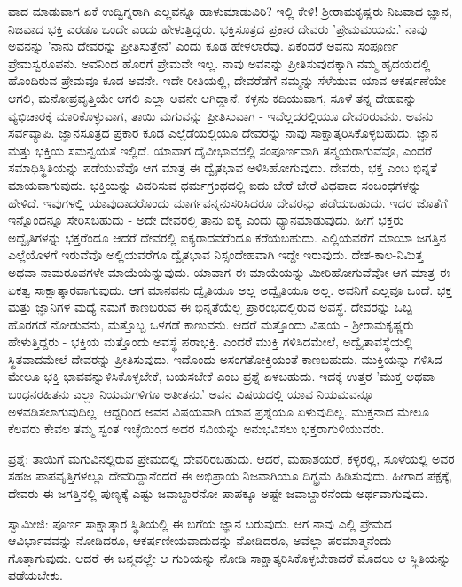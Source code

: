 ವಾದ ಮಾಡುವಾಗ ಏಕೆ ಉದ್ವಿಗ್ನರಾಗಿ ಎಲ್ಲವನ್ನೂ ಹಾಳುಮಾಡುವಿರಿ? ಇಲ್ಲಿ ಕೇಳಿ! ಶ‍್ರೀರಾಮಕೃಷ್ಣರು ನಿಜವಾದ ಜ್ಞಾನ, ನಿಜವಾದ ಭಕ್ತಿ ಎರಡೂ ಒಂದೇ ಎಂದು ಹೇಳುತ್ತಿದ್ದರು. ಭಕ್ತಿಸೂತ್ರದ ಪ್ರಕಾರ ದೇವರು 'ಪ್ರೇಮಮಯನು.' ನಾವು ಅವನನ್ನು 'ನಾನು ದೇವರನ್ನು ಪ್ರೀತಿಸುತ್ತೇನೆ' ಎಂದು ಕೂಡ ಹೇಳಲಾರೆವು. ಏಕೆಂದರೆ ಅವನು ಸಂಪೂರ್ಣ ಪ್ರೇಮಸ್ವರೂಪನು. ಅವನಿಂದ ಹೊರಗೆ ಪ್ರೇಮವೇ ಇಲ್ಲ. ನಾವು ಅವನನ್ನು ಪ್ರೀತಿಸುವುದಕ್ಕಾಗಿ ನಮ್ಮ ಹೃದಯದಲ್ಲಿ ಹೊಂದಿರುವ ಪ್ರೇಮವೂ ಕೂಡ ಅವನೇ. ಇದೇ ರೀತಿಯಲ್ಲಿ, ದೇವರೆಡೆಗೆ ನಮ್ಮನ್ನು ಸೆಳೆಯುವ ಯಾವ ಆಕರ್ಷಣೆಯೇ ಆಗಲಿ, ಮನೋಪ್ರವೃತ್ತಿಯೇ ಆಗಲಿ ಎಲ್ಲಾ ಅವನೇ ಆಗಿದ್ದಾನೆ. ಕಳ್ಳನು ಕದಿಯುವಾಗ, ಸೂಳೆ ತನ್ನ ದೇಹವನ್ನು ವ್ಯಭಿಚಾರಕ್ಕೆ ಮಾರಿಕೊಳ್ಳುವಾಗ, ತಾಯಿ ಮಗುವನ್ನು ಪ್ರೀತಿಸುವಾಗ - ಇವೆಲ್ಲದರಲ್ಲಿಯೂ ದೇವರಿರುವನು. ಅವನು ಸರ್ವವ್ಯಾಪಿ. ಜ್ಞಾನಸೂತ್ರದ ಪ್ರಕಾರ ಕೂಡ ಎಲ್ಲೆಡೆಯಲ್ಲಿಯೂ ದೇವರನ್ನು ನಾವು ಸಾಕ್ಷಾತ್ಕರಿಸಿಕೊಳ್ಳಬಹುದು. ಜ್ಞಾನ ಮತ್ತು ಭಕ್ತಿಯ ಸಮನ್ವಯತೆ ಇಲ್ಲಿದೆ. ಯಾವಾಗ ದೈವೀಭಾವದಲ್ಲಿ ಸಂಪೂರ್ಣವಾಗಿ ತನ್ಮಯರಾಗುವೆವೊ, ಎಂದರೆ ಸಮಾಧಿಸ್ಥಿತಿಯನ್ನು ಪಡೆಯುವೆವೊ ಆಗ ಮಾತ್ರ ಈ ದ್ವೈತಭಾವ ಅಳಿಸಿಹೋಗುವುದು. ದೇವರು, ಭಕ್ತ ಎಂಬ ಭಿನ್ನತೆ ಮಾಯವಾಗುವುದು. ಭಕ್ತಿಯನ್ನು ವಿವರಿಸುವ ಧರ್ಮಗ್ರಂಥದಲ್ಲಿ ಐದು ಬೇರೆ ಬೇರೆ ವಿಧವಾದ ಸಂಬಂಧಗಳನ್ನು ಹೇಳಿದೆ. ಇವುಗಳಲ್ಲಿ ಯಾವುದಾದರೊಂದು ಮಾರ್ಗವನ್ನನುಸರಿಸಿದರೂ ದೇವರನ್ನು ಪಡೆಯಬಹುದು. ಇದರ ಜೊತೆಗೆ ಇನ್ನೊಂದನ್ನೂ ಸೇರಿಸಬಹುದು - ಅದೇ ದೇವರಲ್ಲಿ ತಾನು ಐಕ್ಯ ಎಂದು ಧ್ಯಾನಮಾಡುವುದು. ಹೀಗೆ ಭಕ್ತರು ಅದ್ವೈತಿಗಳನ್ನು ಭಕ್ತರೆಂದೂ ಆದರೆ ದೇವರಲ್ಲಿ ಐಕ್ಯರಾದವರೆಂದೂ ಕರೆಯಬಹುದು. ಎಲ್ಲಿಯವರೆಗೆ ಮಾಯಾ ಜಗತ್ತಿನ ಎಲ್ಲೆಯೊಳಗೆ ಇರುವೆವೊ ಅಲ್ಲಿಯವರೆಗೂ ದ್ವೈತಭಾವ ನಿಸ್ಸಂದೇಹವಾಗಿ ಇದ್ದೇ ಇರುವುದು. ದೇಶ-ಕಾಲ-ನಿಮಿತ್ತ ಅಥವಾ ನಾಮರೂಪಗಳೇ ಮಾಯೆಯೆನ್ನುವುದು. ಯಾವಾಗ ಈ ಮಾಯೆಯನ್ನು ಮೀರಿಹೋಗುವೆವೋ ಆಗ ಮಾತ್ರ ಈ ಏಕತ್ವ ಸಾಕ್ಷಾತ್ಕಾರವಾಗುವುದು. ಆಗ ಮಾನವನು ದ್ವೈತಿಯೂ ಅಲ್ಲ ಅದ್ವೈತಿಯೂ ಅಲ್ಲ. ಅವನಿಗೆ ಎಲ್ಲವೂ ಒಂದೆ. ಭಕ್ತ ಮತ್ತು ಜ್ಞಾನಿಗಳ ಮಧ್ಯೆ ನಮಗೆ ಕಾಣಬರುವ ಈ ಭಿನ್ನತೆಯೆಲ್ಲ ಪ್ರಾರಂಭದಲ್ಲಿರುವ ಅವಸ್ಥೆ. ದೇವರನ್ನು ಒಬ್ಬ ಹೊರಗಡೆ ನೋಡುವನು, ಮತ್ತೊಬ್ಬ ಒಳಗಡೆ ಕಾಣುವನು. ಆದರೆ ಮತ್ತೊಂದು ವಿಷಯ - ಶ‍್ರೀರಾಮಕೃಷ್ಣರು ಹೇಳುತ್ತಿದ್ದರು - ಭಕ್ತಿಯ ಮತ್ತೊಂದು ಅವಸ್ಥೆ ಪರಾಭಕ್ತಿ. ಎಂದರೆ ಮುಕ್ತಿ ಗಳಿಸಿದಮೇಲೆ, ಅದ್ವೈತಾವಸ್ಥೆಯಲ್ಲಿ ಸ್ಥಿತವಾದಮೇಲೆ ದೇವರನ್ನು ಪ್ರೀತಿಸುವುದು. ಇದೊಂದು ಅಸಂಗತೋಕ್ತಿಯಂತೆ ಕಾಣಬಹುದು. ಮುಕ್ತಿಯನ್ನು ಗಳಿಸಿದ ಮೇಲೂ ಭಕ್ತಿ ಭಾವವನ್ನುಳಿಸಿಕೊಳ್ಳಬೇಕೆ, ಬಯಸಬೇಕೆ ಎಂಬ ಪ್ರಶ್ನೆ ಏಳಬಹುದು. ಇದಕ್ಕೆ ಉತ್ತರ 'ಮುಕ್ತ ಅಥವಾ ಬಂಧನರಹಿತನು ಎಲ್ಲಾ ನಿಯಮಗಳಿಗೂ ಅತೀತನು.' ಅವನ ವಿಷಯದಲ್ಲಿ ಯಾವ ನಿಯಮವನ್ನೂ ಅಳವಡಿಸಲಾಗುವುದಿಲ್ಲ. ಆದ್ದರಿಂದ ಅವನ ವಿಷಯವಾಗಿ ಯಾವ ಪ್ರಶ್ನೆಯೂ ಏಳುವುದಿಲ್ಲ. ಮುಕ್ತನಾದ ಮೇಲೂ ಕೆಲವರು ಕೇವಲ ತಮ್ಮ ಸ್ವಂತ ಇಚ್ಛೆಯಿಂದ ಅದರ ಸವಿಯನ್ನು ಅನುಭವಿಸಲು ಭಕ್ತರಾಗುಳಿಯುವರು.

ಪ್ರಶ್ನೆ: ತಾಯಿಗೆ ಮಗುವಿನಲ್ಲಿರುವ ಪ್ರೇಮದಲ್ಲಿ ದೇವರಿರಬಹುದು. ಆದರೆ, ಮಹಾಶಯರೆ, ಕಳ್ಳರಲ್ಲಿ, ಸೂಳೆಯಲ್ಲಿ ಅವರ ಸಹಜ ಪಾಪವೃತ್ತಿಗಳಲ್ಲೂ ದೇವರಿದ್ದಾನೆಂದರೆ ಈ ಅಭಿಪ್ರಾಯ ನಿಜವಾಗಿಯೂ ದಿಗ್ಭ್ರಮೆ ಹಿಡಿಸುವುದು. ಹೀಗಾದ ಪಕ್ಷಕ್ಕೆ, ದೇವರು ಈ ಜಗತ್ತಿನಲ್ಲಿ ಪುಣ್ಯಕ್ಕೆ ಎಷ್ಟು ಜವಾಬ್ದಾರನೋ ಪಾಪಕ್ಕೂ ಅಷ್ಟೇ ಜವಾಬ್ದಾರನೆಂದು ಅರ್ಥವಾಗುವುದು.

ಸ್ವಾಮೀಜಿ: ಪೂರ್ಣ ಸಾಕ್ಷಾತ್ಕಾರ ಸ್ಥಿತಿಯಲ್ಲಿ ಈ ಬಗೆಯ ಜ್ಞಾನ ಬರುವುದು. ಆಗ ನಾವು ಎಲ್ಲಿ ಪ್ರೇಮದ ಆವಿರ್ಭಾವವನ್ನು ನೋಡಿದರೂ, ಆಕರ್ಷಣೀಯವಾದುದನ್ನು ನೋಡಿದರೂ, ಅವೆಲ್ಲಾ ಪರಮಾತ್ಮನೆಂದು ಗೊತ್ತಾಗುವುದು. ಆದರೆ ಈ ಜನ್ಮದಲ್ಲೇ ಆ ಗುರಿಯನ್ನು ನೋಡಿ ಸಾಕ್ಷಾತ್ಕರಿಸಿಕೊಳ್ಳಬೇಕಾದರೆ ಮೊದಲು ಆ ಸ್ಥಿತಿಯನ್ನು ಪಡೆಯಬೇಕು.

